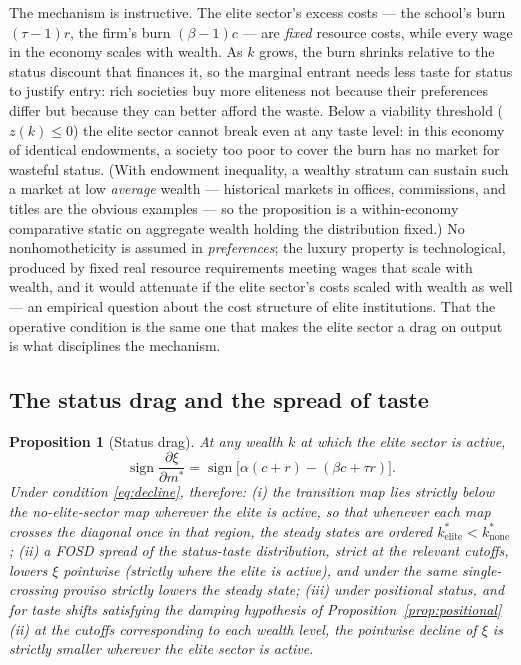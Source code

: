 \documentclass[12pt,letterpaper]{article}
\newtheorem{proposition}{Proposition}
\theoremstyle{definition}
\begin{document}
The mechanism is instructive.
The elite sector's excess costs --- the school's burn $(\tau-1)r$, the firm's burn $(\beta-1)c$ --- are \emph{fixed} resource costs, while every wage in the economy scales with wealth.
As $k$ grows, the burn shrinks relative to the status discount that finances it, so the marginal entrant needs less taste for status to justify entry: rich societies buy more eliteness not because their preferences differ but because they can better afford the waste.
Below a viability threshold ($z(k)\leq 0$) the elite sector cannot break even at any taste level: in this economy of identical endowments, a society too poor to cover the burn has no market for wasteful status.
(With endowment inequality, a wealthy stratum can sustain such a market at low \emph{average} wealth --- historical markets in offices, commissions, and titles are the obvious examples --- so the proposition is a within-economy comparative static on aggregate wealth holding the distribution fixed.)
No nonhomotheticity is assumed in \emph{preferences}; the luxury property is technological, produced by fixed real resource requirements meeting wages that scale with wealth, and it would attenuate if the elite sector's costs scaled with wealth as well --- an empirical question about the cost structure of elite institutions.
That the operative condition is the same one that makes the elite sector a drag on output is what disciplines the mechanism.

\subsection{The status drag and the spread of taste}

\begin{proposition}[Status drag]\label{prop:drag} At any wealth $k$ at which the elite sector is active,
\[
\operatorname{sign}\frac{\partial \xi}{\partial m^\ast}
=
\operatorname{sign}\big[\alpha(c+r)-(\beta c+\tau r)\big].
\]
Under condition \eqref{eq:decline}, therefore: (i) the transition map lies strictly below the no-elite-sector map wherever the elite is active, so that whenever each map crosses the diagonal once in that region, the steady states are ordered $k^\ast_{\mathrm{elite}} < k^\ast_{\mathrm{none}}$; (ii) a FOSD spread of the status-taste distribution, strict at the relevant cutoffs, lowers $\xi$ pointwise (strictly where the elite is active), and under the same single-crossing proviso strictly lowers the steady state; (iii) under positional status, and for taste shifts satisfying the damping hypothesis of Proposition~\ref{prop:positional}(ii) at the cutoffs corresponding to each wealth level, the pointwise decline of $\xi$ is strictly smaller wherever the elite sector is active.
\end{proposition}
\end{document}
